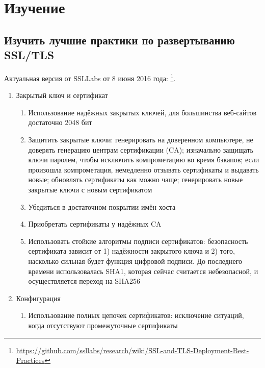 \documentclass[a4paper]{article}
\begin{document}
\section{Изучение}

\subsection{Изучить лучшие практики по развертыванию SSL/TLS}

Актуальная версия от SSLLabs от 8 июня 2016 года: \footnote{\url{https://github.com/ssllabs/research/wiki/SSL-and-TLS-Deployment-Best-Practices}}.

\begin{enumerate}

\item Закрытый ключ и сертификат

	\begin{enumerate}
	
	\item Использование надёжных закрытых ключей, для большинства веб-сайтов достаточно 2048 бит
	
	\item Защитить закрытые ключи: генерировать на доверенном компьютере, не доверять генерацию центрам сертификации (CA); изначально защищать ключи паролем, чтобы исключить компрометацию во время бэкапов; если произошла компрометация, немедленно отзывать сертификаты и выдавать новые; обновлять сертификаты как можно чаще; генерировать новые закрытые ключи с новым сертификатом

	\item Убедиться в достаточном покрытии имён хоста
	
	\item Приобретать сертификаты у надёжных CA
	
	\item Использовать стойкие алгоритмы подписи сертификатов: безопасность сертификата зависит от 1) надёжности закрытого ключа и 2) того, насколько сильная будет функция цифровой подписи. До последнего времени использовалась SHA1, которая сейчас считается небезопасной, и осуществляется переход на SHA256
	
	\end{enumerate}

\item Конфигурация

	\begin{enumerate}
	
	\item Использование полных цепочек сертификатов: исключение ситуаций, когда отсутствуют промежуточные сертификаты
	

\end{enumerate}
\end{enumerate}
\end{document}

